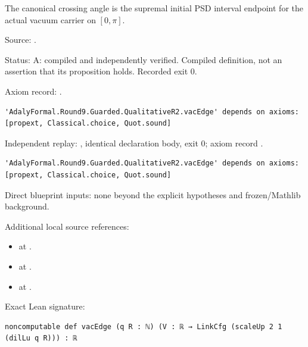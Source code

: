 \begin{definition}[bp-111]
\label{bp-111}
\uses{}
\leanok
The canonical crossing angle is the supremal initial PSD interval endpoint for the actual vacuum carrier on \([0,\pi]\).

\par Source: \texttt{}.
\par Status: A: compiled and independently verified. Compiled definition, not an assertion that its proposition holds. Recorded exit 0.
\par Axiom record: \texttt{}.
\begin{verbatim}
'AdalyFormal.Round9.Guarded.QualitativeR2.vacEdge' depends on axioms: [propext, Classical.choice, Quot.sound]
\end{verbatim}
\par Independent replay: \texttt{}, identical declaration body, exit 0; axiom record \texttt{}.
\begin{verbatim}
'AdalyFormal.Round9.Guarded.QualitativeR2.vacEdge' depends on axioms: [propext, Classical.choice, Quot.sound]
\end{verbatim}
\par Direct blueprint inputs: none beyond the explicit hypotheses and frozen/Mathlib background.
\par Additional local source references:
\begin{itemize}
\item \texttt{} at \texttt{}.
\item \texttt{} at \texttt{}.
\item \texttt{} at \texttt{}.
\end{itemize}
\par Exact Lean signature:
\begin{verbatim}
noncomputable def vacEdge (q R : ℕ) (V : ℝ → LinkCfg (scaleUp 2 1 (dilLu q R))) : ℝ
\end{verbatim}
\end{definition}

